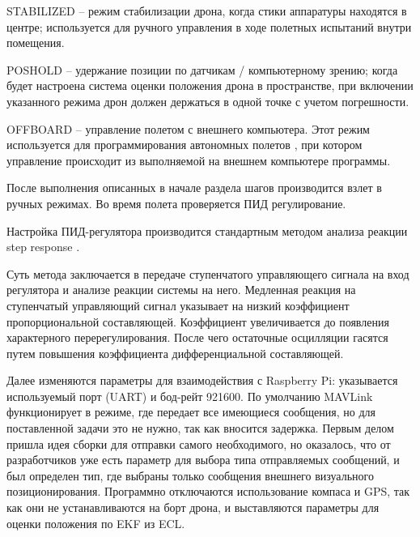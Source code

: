 STABILIZED -- режим стабилизации дрона, когда стики аппаратуры находятся в центре; используется для ручного управления в ходе полетных испытаний внутри помещения.

POSHOLD -- удержание позиции по датчикам / компьютерному зрению; когда будет настроена система оценки положения дрона в пространстве, при включении указанного режима дрон должен держаться в одной точке с учетом погрешности.

OFFBOARD -- управление полетом с внешнего компьютера. Этот режим используется для программирования автономных полетов \cite{clover}, при котором управление происходит из выполняемой на внешнем компьютере программы.

После выполнения описанных в начале раздела шагов производится взлет в ручных режимах. Во время полета проверяется ПИД регулирование.

Настройка ПИД-регулятора производится стандартным методом анализа реакции step res\-ponse \cite{step}.

Суть метода заключается в передаче ступенчатого управляющего сигнала на вход регулятора и анализе реакции системы на него.
Медленная реакция на ступенчатый управляющий сигнал указывает на низкий коэффициент пропорциональной составляющей.
Коэффициент увеличивается до появления характерного перерегулирования.
После чего остаточные осцилляции гасятся путем повышения коэффициента дифференциальной составляющей.

Далее изменяются параметры для взаимодействия с Raspberry Pi: указывается используемый порт (UART) и бод-рейт 921600.
По умолчанию MAVLink функционирует в режиме, где передает все имеющиеся сообщения, но для поставленной задачи это не нужно, так как вносится задержка. Первым делом пришла идея сборки для отправки самого необходимого, но оказалось, что от разработчиков уже есть параметр для выбора типа отправляемых сообщений, и был определен тип, где выбраны только сообщения внешнего визуального позиционирования.
Программно отключаются использование компаса и GPS, так как они не устанавливаются на борт дрона, и выставляются параметры для оценки положения по EKF из ECL.

